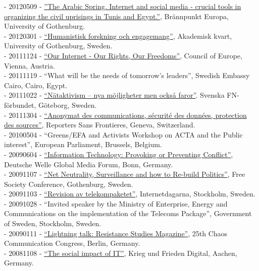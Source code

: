 \documentclass[a4paper,11pt,oneside]{article}
\begin{document}
    - 20120509 - \href{http://pol.gu.se/aktuellt/kalendarium/aktuellt_detalj/?eventId=1777397828}{''The Arabic Spring. Internet and social media - crucial tools in organizing the civil uprisings in Tunis and Egypt.''}, Brännpunkt Europa, University of Gothenburg. \\
    - 20120301 - \href{http://www.youtube.com/watch?v=-HYfVmanye8}{``Humanistisk forskning och engagemang''}, Akademisk kvart, University of Gothenburg, Sweden. \\
    - 20111124 - \href{https://www.youtube.com/watch?v=zWROWpMaKmE}{``Our Internet - Our Rights, Our Freedoms''}, Council of Europe, Vienna, Austria. \\
    - 20111119 - ``What will be the needs of tomorrow's leaders'', Swedish Embassy Cairo, Cairo, Egypt. \\
    - 20111022 - \href{http://www.youtube.com/watch?v=6Mi0g93ModU}{``Nätaktivism – nya möjligheter men också faror''}. Svenska FN-förbundet, Göteborg, Sweden. \\
    - 20111304 - \href{http://www.rsf-ch.ch/anonymat-des-communications-s%C3%A9curit%C3%A9-des-donn%C3%A9es-protection-des-sources-0}{``Anonymat des communications, sécurité des données, protection des sources''}, Reporters Sans Frontieres, Geneva, Switzerland. \\
    - 20100504 - ``Greens/EFA and Activists Workshop on ACTA and the Public interest'', European Parliament, Brussels, Belgium. \\
    - 20090604 - \href{https://issuu.com/deutsche-welle/docs/program-deutsche-welle-global-media-forum-2009}{``Information Technology: Provoking or Preventing Conflict''}, Deutsche Welle Global Media Forum, Bonn, Germany. \\
    - 20091107 - \href{https://vimeo.com/10286077}{``Net Neutrality, Surveillance and how to Re-build Politics''}, Free Society Conference, Gothenburg, Sweden. \\
    - 20091103 - \href{https://internetdagarna.se/arkiv/2009/program-2009/3-november.html}{``Revision av telekompaketet''}, Internetdagarna, Stockholm, Sweden. \\
    - 20091028 - ``Invited speaker by the Ministry of Enterprise, Energy and Communications on the implementation of the Telecoms Package'', Government of Sweden, Stockholm, Sweden.\\
    - 20090111 - \href{https://www.youtube.com/watch?v=G9cXIKvywvs}{``Lightning talk: Resistance Studies Magazine''}, 25th Chaos Communication Congress, Berlin, Germany.\\
    - 20081108 - \href{http://www.fiff.de/veranstaltungen/fiff-jahrestagungen/fiff-jahrestagung-2008-krieg-und-frieden-digital/Programmheft.pdf/at_download/file}{``The social impact of IT''}, Krieg und Frieden Digital, Aachen, Germany.
\end{document}
